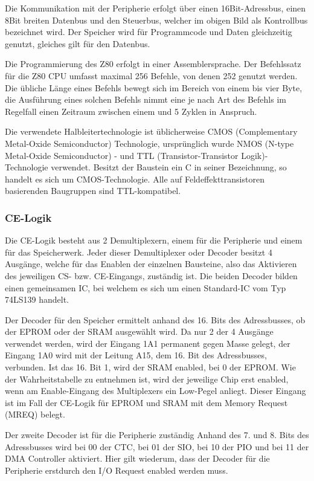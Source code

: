 Die Kommunikation mit der Peripherie erfolgt über einen 16Bit-Adressbus, einen 8Bit breiten Datenbus und den Steuerbus, welcher im obigen Bild als Kontrollbus bezeichnet wird. Der Speicher wird für Programmcode und Daten gleichzeitig genutzt, gleiches gilt für den Datenbus.

Die Programmierung des Z80 erfolgt in einer Assemblersprache. Der Befehlssatz für die Z80 CPU umfasst maximal 256 Befehle, von denen 252 genutzt werden. Die übliche Länge eines Befehls bewegt sich im Bereich von einem bis vier Byte, die Ausführung eines solchen Befehls nimmt eine je nach Art des Befehls im Regelfall einen Zeitraum zwischen einem und 5 Zyklen in Anspruch.

Die verwendete Halbleitertechnologie ist üblicherweise CMOS (Complementary Metal-Oxide Semiconductor) Technologie, ursprünglich wurde NMOS (N-type Metal-Oxide Semiconductor) - und TTL (Transistor-Transistor Logik)-Technologie verwendet. Besitzt der Baustein ein C in seiner Bezeichnung, so handelt es sich um CMOS-Technologie. Alle auf Feldeffekttransistoren basierenden Baugruppen sind TTL-kompatibel.

\subsubsection{CE-Logik}
Die CE-Logik besteht aus 2 Demultiplexern, einem für die Peripherie und einem für das Speicherwerk. Jeder dieser Demultiplexer oder Decoder besitzt 4 Ausgänge, welche für das Enablen der einzelnen Bausteine, also das Aktivieren des jeweiligen CS- bzw. CE-Eingangs, zuständig ist. Die beiden Decoder bilden einen gemeinsamen IC, bei welchem es sich um einen Standard-IC vom Typ 74LS139 handelt.

Der Decoder für den Speicher ermittelt anhand des 16. Bits des Adressbusses, ob der EPROM oder der SRAM ausgewählt wird. Da nur 2 der 4 Ausgänge verwendet werden, wird der Eingang 1A1 permanent gegen Masse gelegt, der Eingang 1A0 wird mit der Leitung A15, dem 16. Bit des Adressbusses, verbunden. Ist das 16. Bit 1, wird der SRAM enabled, bei 0 der EPROM. Wie der Wahrheitstabelle zu entnehmen ist, wird der jeweilige Chip erst enabled, wenn am Enable-Eingang des Multiplexers ein Low-Pegel anliegt. Dieser Eingang ist im Fall der CE-Logik für EPROM und SRAM mit dem Memory Request (MREQ) belegt.

Der zweite Decoder ist für die Peripherie zuständig Anhand des 7. und 8. Bits des Adressbusses wird bei 00 der CTC, bei 01 der SIO, bei 10 der PIO und bei 11 der DMA Controller aktiviert. Hier gilt wiederum, dass der Decoder für die Peripherie erstdurch den I/O Request enabled werden muss.

